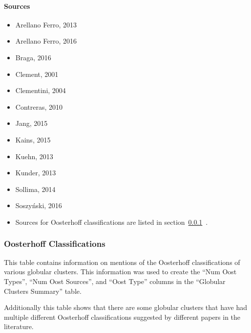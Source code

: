 \documentclass[]{article}
\begin{document}
\paragraph{Sources}

\begin{itemize}
	\item Arellano Ferro, 2013 \cite{arellano_ferro_2013}
	\item Arellano Ferro, 2016 \cite{arellano_ferro_2016_b}
	\item Braga, 2016 \cite{braga_2016}
	\item Clement, 2001 \cite{clement_2001_a}
	\item Clementini, 2004 \cite{clementini_2004}
	\item Contreras, 2010 \cite{contreras_2010}
	\item Jang, 2015 \cite{jang_2015}
	\item Kains, 2015 \cite{kains_2015}
	\item Kuehn, 2013 \cite{kuehn_2013}
	\item Kunder, 2013 \cite{kunder_2013_d}
	\item Sollima, 2014 \cite{sollima_2014}
	\item Soszyński, 2016 \cite{soszynski_2016}
	\item Sources for Oosterhoff classifications are listed in section~\ref{sec:app_oosterhoff_classifications}~.
\end{itemize}

\newpage

\subsubsection{Oosterhoff Classifications}
\label{sec:app_oosterhoff_classifications}

This table contains information on mentions of the Oosterhoff classifications of various globular clusters. This information was used to create the ``Num Oost Types'', ``Num Oost Sources'', and ``Oost Type'' columns in the ``Globular Clusters Summary'' table.

\vspace{12pt}

Additionally this table shows that there are some globular clusters that have had multiple different Oosterhoff classifications suggested by different papers in the literature.

\vspace{12pt}
\end{document}
